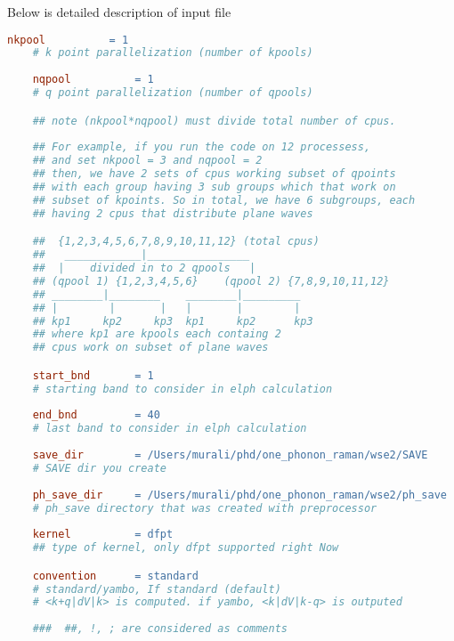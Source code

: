 \documentclass[12pt,twoside,openany]{book}
\begin{document}
Below is detailed description of input file
\begin{lstlisting}[language=make]
    nkpool          = 1 
    # k point parallelization (number of kpools)
    
    nqpool          = 1
    # q point parallelization (number of qpools)

    ## note (nkpool*nqpool) must divide total number of cpus.
    
    ## For example, if you run the code on 12 processess, 
    ## and set nkpool = 3 and nqpool = 2
    ## then, we have 2 sets of cpus working subset of qpoints 
    ## with each group having 3 sub groups which that work on 
    ## subset of kpoints. So in total, we have 6 subgroups, each 
    ## having 2 cpus that distribute plane waves 

    ##  {1,2,3,4,5,6,7,8,9,10,11,12} (total cpus)
    ##   ____________|________________
    ##  |    divided in to 2 qpools   |
    ## (qpool 1) {1,2,3,4,5,6}    (qpool 2) {7,8,9,10,11,12}
    ## ________|________    ________|_________
    ## |        |       |   |       |        |
    ## kp1     kp2     kp3  kp1     kp2      kp3
    ## where kp1 are kpools each containg 2 
    ## cpus work on subset of plane waves

    start_bnd       = 1
    # starting band to consider in elph calculation
    
    end_bnd         = 40
    # last band to consider in elph calculation
    
    save_dir        = /Users/murali/phd/one_phonon_raman/wse2/SAVE
    # SAVE dir you create 
    
    ph_save_dir     = /Users/murali/phd/one_phonon_raman/wse2/ph_save
    # ph_save directory that was created with preprocessor
    
    kernel          = dfpt
    ## type of kernel, only dfpt supported right Now

    convention      = standard 
    # standard/yambo, If standard (default) 
    # <k+q|dV|k> is computed. if yambo, <k|dV|k-q> is outputed 
    
    ###  ##, !, ; are considered as comments
\end{lstlisting}

%
%
%
%
%
%
%
%
\end{document}
